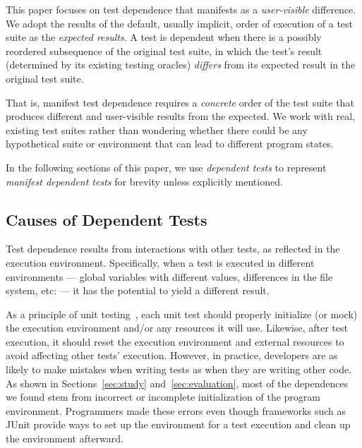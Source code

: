 This paper focuses on test
dependence that manifests as a \textit{user-visible}
difference. We adopt the results of the default, usually
implicit, order of execution of a test suite as the
\textit{expected results}. A test is dependent when there is a possibly
reordered subsequence of the original test suite, in which
the test's result (determined by its existing testing
oracles) \textit{differs} from its expected result in the
original test suite.

That is, manifest test dependence
requires a \emph{concrete} order of the test suite that
produces {different} and {user-visible} results from the expected.  
%
We work with real, existing test suites rather than wondering
whether there could be any hypothetical suite 
or environment that can lead to different program states.

In the following sections of this paper, we use \textit{dependent tests}
to represent \textit{manifest dependent tests} for brevity
unless explicitly mentioned.





\subsection{Causes of Dependent Tests}


Test dependence results from interactions with other tests, as reflected
in the execution environment.
Specifically, when a
test is executed in different environments --- global variables
with different values, differences in the file system, etc: --- it has the
potential to yield
a different result.  

As a principle of unit testing~\cite{Massol:2003}, each unit
test should properly initialize (or mock) the execution environment
and/or any resources it will use.
Likewise, after test execution, it should reset the
execution environment and external resources
to avoid affecting other tests' execution.
%
%
However, in practice,
developers are as likely
to make mistakes when writing tests as when they are writing other code.
As shown in Sections~\ref{sec:study} and~\ref{sec:evaluation}, most of the dependences we found
stem from incorrect or incomplete initialization
of the program environment.
Programmers made these errors even though frameworks such as
JUnit provide ways to set up the environment for a test execution and clean
up the environment afterward.


